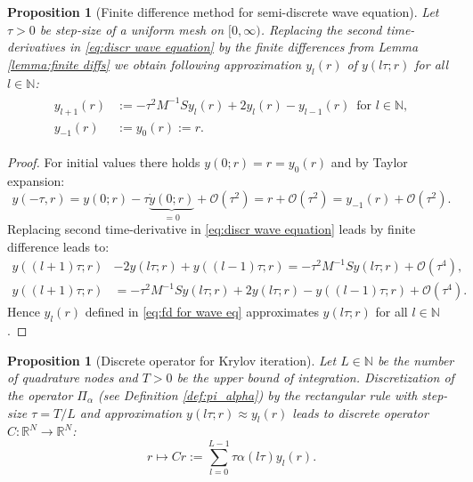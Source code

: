 \documentclass[a4paper,11pt,bibliography=totoc,listof=totoc,headinclude=true,cleardoublepage=empty,oneside]{scrbook}
\newtheorem{prop}[theorem]{Proposition}
\newcommand{\R}{\mathbb{R}}
\newcommand{\N}{\mathbb{N}}
\newcommand{\bigO}{\mathcal{O}}
\begin{document}
\begin{prop}[Finite difference method for semi-discrete wave equation]
    Let $\tau>0$ be step-size of a uniform mesh on $[0, \infty)$. Replacing the second time-derivatives in \eqref{eq:discr wave equation} by the finite differences from Lemma \ref{lemma:finite diffs} we obtain following approximation $y_l(r)$ of $y(l\tau; r)$ for all $l \in \N$:
    \begin{align}\label{eq:fd for wave eq}
    \begin{split}
        y_{l+1}(r) &:= -\tau^2M^{-1}S y_l(r) + 2y_l(r) - y_{l-1}(r) \, \text{ for } l \in \N, \\
        y_{-1}(r) &:= y_0(r) := r.
    \end{split}
    \end{align}
\end{prop}
\begin{proof}
    For initial values there holds $y(0; r) = r = y_0(r)$ and by Taylor expansion:
    \begin{equation*}
        y(-\tau, r) = y(0; r) - \tau \underbrace{\dot{y}(0; r)}_{=0} + \bigO(\tau^2) = r + \bigO(\tau^2) = y_{-1}(r) + \bigO(\tau^2).
    \end{equation*} 
    Replacing second time-derivative in \eqref{eq:discr wave equation} leads by finite difference leads to:
    \begin{align*}
        y((l+1)\tau; r) &- 2 y(l\tau; r) + y((l-1)\tau; r) = -\tau^2 M^{-1}S y(l\tau; r) + \bigO(\tau^4), \\
        y((l+1)\tau; r) &= -\tau^2 M^{-1}S y(l\tau; r) + 2y(l\tau; r) - y((l-1)\tau; r) + \bigO(\tau^4).
    \end{align*}
    Hence $y_l(r)$ defined in \eqref{eq:fd for wave eq} approximates $y(l\tau; r)$ for all $l \in \N$.
\end{proof}

\begin{prop}[Discrete operator for Krylov iteration]\label{prop:C operator}
    Let $L \in \N$ be the number of quadrature nodes and $T>0$ be the upper bound of integration. Discretization of the operator $\Pi_\alpha$ (see Definition \ref{def:pi_alpha}) by the rectangular rule with step-size $\tau = T/L$ and approximation $y(l\tau; r) \approx y_l(r)$ leads to discrete operator $C : \R^N \rightarrow \R^N$:
    \begin{equation*}
        r \mapsto Cr := \sum_{l=0}^{L-1} \tau \alpha(l\tau) y_l(r).
    \end{equation*}
\end{prop}
\end{document}
